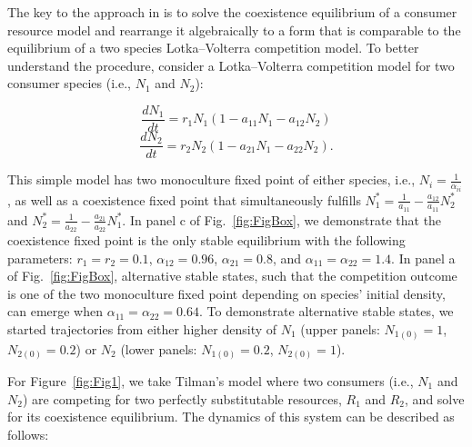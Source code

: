 The key to the approach in \citep{Letten2017} is to solve the coexistence equilibrium of a consumer resource model and rearrange it algebraically to a form that is comparable to the equilibrium of a two species Lotka--Volterra competition model. To better understand the procedure, consider a Lotka--Volterra competition model for two consumer species (i.e., $N_{1}$ and $N_{2}$):

\begin{equation}
\frac{dN_{1}}{dt}=r_{1}N_{1}\left ( 1-a_{11}N_{1}-a_{12}N_{2} \right )
\tag{S3.1.1}\label{eq:S3.1.1}
\end{equation}
\begin{equation}
\frac{dN_{2}}{dt}=r_{2}N_{2}\left ( 1-a_{21}N_{1}-a_{22}N_{2} \right ). 
\tag{S3.1.2}\label{eq:S3.1.2}
\end{equation}

\noindent This simple model has two monoculture fixed point of either species, i.e., $N_{i} = \frac{1}{\alpha_{ii}}$, as well as a coexistence fixed point that simultaneously fulfills  $N_{1}^{*}=\frac{1}{a_{11}}-\frac{a_{12}}{a_{11}}N_{2}^{*}$ and $N_{2}^{*}=\frac{1}{a_{22}}-\frac{a_{21}}{a_{22}}N_{1}^{*}$. In panel c of Fig.~\ref{fig:FigBox}, we demonstrate that the coexistence fixed point is the only stable equilibrium with the following parameters: $r_{1} = r_{2} = 0.1$, $\alpha_{12} = 0.96$, $\alpha_{21} = 0.8$, and $\alpha_{11} = \alpha_{22} = 1.4$. In panel a of Fig.~\ref{fig:FigBox}, alternative stable states, such that the competition outcome is one of the two monoculture fixed point depending on species' initial density, can emerge when $\alpha_{11} = \alpha_{22} = 0.64$. To demonstrate alternative stable states, we started trajectories from either higher density of $N_{1}$ (upper panels: $N_{1(0)}=1$, $N_{2(0)}=0.2$) or $N_{2}$ (lower panels: $N_{1(0)}=0.2$, $N_{2(0)}=1$). 
\par


For Figure~\ref{fig:Fig1}, we take Tilman's model \citep[p.~270]{tilman1982} where two consumers (i.e., $N_{1}$ and $N_{2}$) are competing for two perfectly substitutable resources, $R_{1}$ and $R_{2}$, and solve for its coexistence equilibrium. The dynamics of this system can be described as follows:

